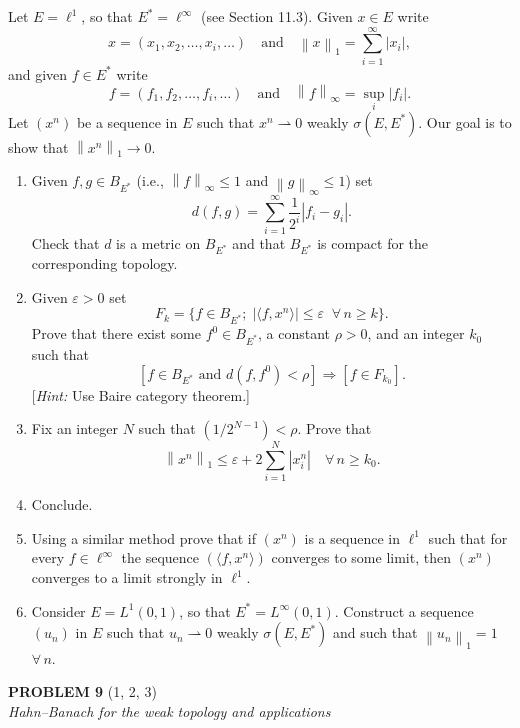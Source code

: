\documentclass[12pt]{article}
\newcommand{\norm}[1]{\left\|#1\right\|}
\newcommand{\abs}[1]{\left|#1\right|}
\newcommand{\ip}[2]{\langle #1, #2 \rangle}
\begin{document}
Let $E = \ell^1$, so that $E^* = \ell^\infty$ (see Section 11.3). Given $x \in E$ write
\[
x = (x_1, x_2, \ldots, x_i, \ldots) \quad \text{and} \quad \norm{x}_1 = \sum_{i=1}^\infty \abs{x_i},
\]
and given $f \in E^*$ write
\[
f = (f_1, f_2, \ldots, f_i, \ldots) \quad \text{and} \quad \norm{f}_\infty = \sup_i \abs{f_i}.
\]
Let $(x^n)$ be a sequence in $E$ such that $x^n \rightharpoonup 0$ weakly $\sigma(E,E^*)$.
Our goal is to show that $\norm{x^n}_1 \to 0$.

\begin{enumerate}
\item Given $f, g \in B_{E^*}$ (i.e., $\norm{f}_\infty \le 1$ and $\norm{g}_\infty \le 1$) set
\[
d(f,g) = \sum_{i=1}^\infty \frac{1}{2^i}\abs{f_i - g_i}.
\]
Check that $d$ is a metric on $B_{E^*}$ and that $B_{E^*}$ is compact for the corresponding
topology.

\item Given $\varepsilon > 0$ set
\[
F_k = \{f \in B_{E^*};\; \abs{\ip{f}{x^n}} \le \varepsilon\;\;\forall\, n \ge k\}.
\]
Prove that there exist some $f^0 \in B_{E^*}$, a constant $\rho > 0$, and an integer $k_0$ such that
\[
[f \in B_{E^*} \text{ and } d(f,f^0) < \rho] \Rightarrow [f \in F_{k_0}].
\]
[\textit{Hint:} Use Baire category theorem.]

\item Fix an integer $N$ such that $(1/2^{N-1}) < \rho$. Prove that
\[
\norm{x^n}_1 \le \varepsilon + 2\sum_{i=1}^{N}\abs{x^n_i} \quad \forall\, n \ge k_0.
\]

\item Conclude.

\item Using a similar method prove that if $(x^n)$ is a sequence in $\ell^1$ such that for every
$f \in \ell^\infty$ the sequence $(\ip{f}{x^n})$ converges to some limit, then $(x^n)$ converges
to a limit strongly in $\ell^1$.

\item Consider $E = L^1(0,1)$, so that $E^* = L^\infty(0,1)$. Construct a sequence $(u_n)$ in $E$
such that $u_n \rightharpoonup 0$ weakly $\sigma(E,E^*)$ and such that $\norm{u_n}_1 = 1$ $\forall\, n$.
\end{enumerate}

\bigskip

\noindent\textbf{PROBLEM 9} (1, 2, 3)\\[4pt]
\textit{Hahn--Banach for the weak topology and applications}
\end{document}
